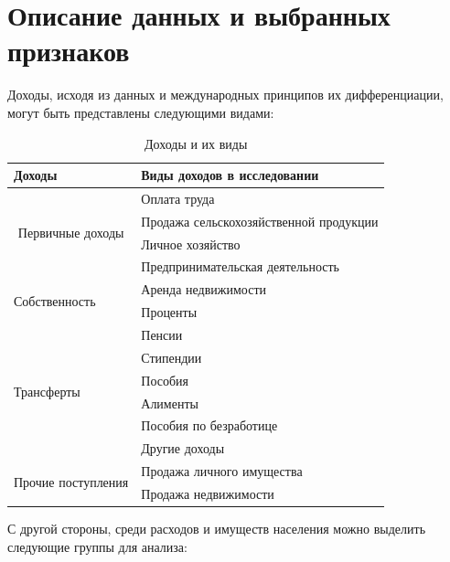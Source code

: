 \documentclass[12pt]{report}
\begin{document}
\section{Описание данных и выбранных признаков}
\par
Доходы, исходя из данных и международных принципов их дифференциации, могут быть представлены следующими видами:
\begin{table}[H]
    \centering
    \begin{tabular}{|l|l|}
        \hline
        Доходы                                                  & Виды доходов в исследовании            \\ \hline
        \multicolumn{1}{|c|}{\multirow{4}{*}{Первичные доходы}} & Оплата труда                           \\ \cline{2-2} 
        \multicolumn{1}{|c|}{}                                  & Продажа сельскохозяйственной продукции \\ \cline{2-2} 
        \multicolumn{1}{|c|}{}                                  & Личное хозяйство                       \\ \cline{2-2} 
        \multicolumn{1}{|c|}{}                                  & Предпринимательская деятельность       \\ \hline
        \multirow{2}{*}{Собственность}                          & Аренда недвижимости                    \\ \cline{2-2} 
                                                                & Проценты                               \\ \hline
        \multirow{6}{*}{Трансферты}                             & Пенсии                                 \\ \cline{2-2} 
                                                                & Стипендии                              \\ \cline{2-2} 
                                                                & Пособия                                \\ \cline{2-2} 
                                                                & Алименты                               \\ \cline{2-2} 
                                                                & Пособия по безработице                 \\ \cline{2-2} 
                                                                & Другие доходы                          \\ \hline
        \multirow{2}{*}{Прочие поступления}                     & Продажа личного имущества              \\ \cline{2-2} 
                                                                & Продажа недвижимости                   \\ \hline
        \end{tabular}
\caption{Доходы и их виды}
\end{table}
\par
С другой стороны, среди расходов и имуществ населения можно выделить следующие группы для анализа:
\end{document}
